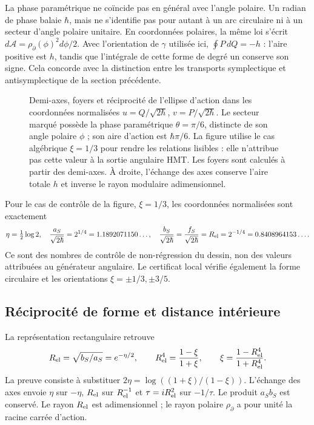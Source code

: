La phase paramétrique ne coïncide pas en général avec l’angle polaire. Un radian
de phase balaie \(\hbar\), mais ne s’identifie pas pour autant à un arc
circulaire ni à un secteur d’angle polaire unitaire. En coordonnées polaires,
la même loi s’écrit
\(d\mathcal A=\rho_{\partial}(\phi)^2d\phi/2\).
Avec l’orientation de \(\gamma\) utilisée ici,
\(\oint P\,dQ=-h\) : l’aire positive est \(h\), tandis que
l’intégrale de cette forme de degré un conserve son signe. Cela concorde avec la
distinction entre les transports symplectique et antisymplectique de la
section précédente.

\begin{figure}[htbp]
 \centering
 
 \caption{Demi-axes, foyers et réciprocité de l'ellipse d'action dans les
 coordonnées normalisées \(u=Q/\sqrt{2\hbar}\),
 \(v=P/\sqrt{2\hbar}\). Le secteur marqué possède la phase paramétrique
 \(\theta=\pi/6\), distincte de son angle polaire \(\phi\) ; son aire
 d'action est \(\hbar\pi/6\). La figure utilise le cas algébrique
 \(\xi=1/3\) pour rendre les relations lisibles : elle n'attribue pas cette valeur
 à la sortie angulaire HMT. Les foyers sont calculés à partir des demi-axes.
 À droite, l'échange des axes conserve l'aire totale \(h\)
 et inverse le rayon modulaire adimensionnel.}
 \label{fig:ii-elipse-calculada}
\end{figure}

Pour le cas de contrôle de la figure, \(\xi=1/3\), les coordonnées
normalisées sont exactement
\[
 \eta=\tfrac12\log2,\quad
 \frac{a_S}{\sqrt{2\hbar}}=2^{1/4}=1.1892071150\ldots,\quad
 \frac{b_S}{\sqrt{2\hbar}}=
 \frac{f_S}{\sqrt{2\hbar}}=R_{\rm el}=2^{-1/4}=0.8408964153\ldots.
\]
Ce sont des nombres de contrôle de non-régression du dessin, non des valeurs attribuées au générateur
angulaire. Le certificat local vérifie également la forme circulaire et les
orientations \(\xi=\pm1/3,\pm3/5\).

\subsection{Réciprocité de forme et distance intérieure}

La représentation rectangulaire retrouve
\begin{equation}
 R_{\rm el}=\sqrt{b_S/a_S}=e^{-\eta/2},\qquad
 R_{\rm el}^4=\frac{1-\xi}{1+\xi},\qquad
 \xi=\frac{1-R_{\rm el}^4}{1+R_{\rm el}^4}.
 \label{eq:ii-elipse-reciproca}
\end{equation}
La preuve consiste à substituer
\(2\eta=\log((1+\xi)/(1-\xi))\). L'échange des axes
envoie \(\eta\) sur \(-\eta\), \(R_{\rm el}\) sur
\(R_{\rm el}^{-1}\) et \(\tau=iR_{\rm el}^2\) sur \(-1/\tau\).
Le produit \(a_Sb_S\) est conservé. Le rayon \(R_{\rm el}\) est adimensionnel ;
le rayon polaire \(\rho_{\partial}\) a pour unité la racine carrée d'action.

